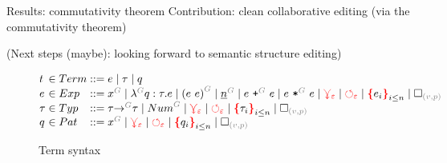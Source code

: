 \documentclass[nonacm, acmsmall, screen, review]{acmart}
\newcommand{\e}{\varepsilon}
\newcommand{\id}[1]{\textcolor{gray}{\ensuremath{#1}}}
\newcommand{\eid}[2]{{#2}^{\id{#1}}}
\newcommand{\conflictHole}[1]{%
{\noexpandarg\StrSubstitute{#1}{,}{\textcolor{red}{\,\textbf{|}\,}}[\myargs]%
{\textcolor{red}{\textbf{\{}}\myargs\textcolor{red}{\textbf{\}}}}}}%
\newcommand{\emptyHole}[2]{\square_{\id{(#1, #2)}}}
\newcommand{\eVar}[2]{\eid{#1}{#2}}
\newcommand{\eFun}[4]{\eid{#1}{\lambda} #2 : #3 . #4}
\newcommand{\eApp}[3]{\eid{#1}{\left(#2~#3\right)}}
\newcommand{\eNum}[2]{\eid{#1}{\underline{#2}}}
\newcommand{\ePlus}[3]{#2~\eid{#1}{\texttt{+}}~#3}
\newcommand{\eTimes}[3]{#2~\eid{#1}{\texttt{*}}~#3}
\newcommand{\pVar}[2]{\eid{#1}{#2}}
\newcommand{\tArrow}[3]{#2 \eid{#1}{\rightarrow} #3}
\newcommand{\tNum}[1]{\eid{#1}{Num}}
\newcommand{\multiVertex}[1]{\textcolor{red}{\ensuremath{\curlyveedownarrow_{#1}}}}
\newcommand{\cycleVertex}[1]{\textcolor{red}{\ensuremath{\circlearrowleft_{#1}}}}
\begin{document}
Results: commutativity theorem
Contribution: clean collaborative editing (via the commutativity theorem)

(Next steps (maybe): looking forward to semantic structure editing)



\begin{figure}
  \[
    \arraycolsep=0pt
    \begin{array}{lcllll}
      t & {}\in{} & Term & {}::={} &
        e
        \mid \tau
        \mid q
      \\
      e & {}\in{} & Exp & {}::={} &
        \eVar{G}{x}
        \mid \eFun{G}{q}{\tau}{e}
        \mid \eApp{G}{e}{e}
        \mid \eNum{G}{n}
        \mid \ePlus{G}{e}{e}
        \mid \eTimes{G}{e}{e}
        \mid \multiVertex{\e}
        \mid \cycleVertex{\e}
        \mid \conflictHole{e_i}_{i \leq n}
        \mid \emptyHole{v}{p}
      \\
      \tau & {}\in{} & Typ & {}::={} &
        \tArrow{G}{\tau}{\tau}
        \mid \tNum{G}
        \mid \multiVertex{\e}
        \mid \cycleVertex{\e}
        \mid \conflictHole{\tau_i}_{i \leq n}
        \mid \emptyHole{v}{p}
      \\
      q & {}\in{} & Pat{} & {}::={} &
        \pVar{G}{x}
        \mid \multiVertex{\e}
        \mid \cycleVertex{\e}
        \mid \conflictHole{q_i}_{i \leq n}
        \mid \emptyHole{v}{p}
      \\
    \end{array}
  \]  
  \caption{Term syntax}
  \label{fig:Term syntax}
\end{figure}%
\end{document}
